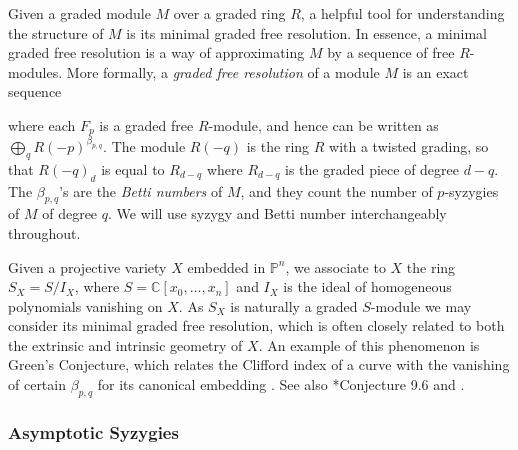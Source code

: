 \documentclass[11pt,reqno]{amsart}
\newtheorem{theorem}[lemma]{Theorem}
\theoremstyle{remark}
\newcommand{\C}{\mathbb{C}}
\renewcommand{\P}{\mathbb{P}}
\begin{document}
Given a graded module $M$ over a graded ring $R$, a helpful tool for understanding the structure of $M$ is its minimal graded free resolution. In essence, a minimal graded free resolution is a way of approximating $M$ by a sequence of free $R$-modules. More formally, a \textit{graded free resolution} of a module $M$ is an exact sequence 
\begin{center}
\end{center}
where each $F_{p}$ is a graded free $R$-module, and hence can be written as $\bigoplus_{q}R(-p)^{\beta_{p,q}}$. The module $R(-q)$ is the ring $R$ with a twisted grading, so that $R(-q)_{d}$ is equal to $R_{d-q}$ where $R_{d-q}$ is the graded piece of degree $d-q$. The $\beta_{p,q}$'s are the \textit{Betti numbers} of $M$, and they count the number of $p$-syzygies of $M$ of degree $q$. We will use syzygy and Betti number interchangeably throughout. 

Given a projective variety $X$ embedded in $\P^n$, we associate to $X$ the ring $S_X=S/I_X$, where $S=\C[x_0,\ldots,x_n]$ and $I_X$ is the ideal of homogeneous polynomials vanishing on $X$. As $S_X$ is naturally a graded $S$-module we may consider its minimal graded free resolution, which is often closely related to both the extrinsic and intrinsic geometry of $X$.  An example of this phenomenon
 is Green's Conjecture, which relates the Clifford index of a curve with the vanishing of certain $\beta_{p,q}$ for its canonical embedding \cite{voisin02, voisin05, aproduFarkas19}. See also \cite{eisenbud05}*{Conjecture 9.6} and \cite{schreyer86, bayerEisenbud91}.


\subsubsection{Asymptotic Syzygies}
\end{document}
